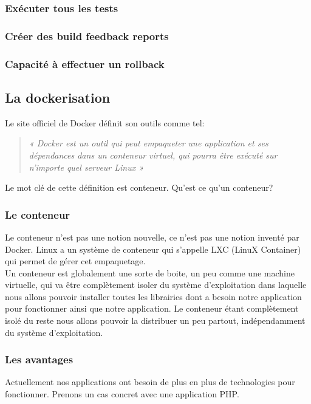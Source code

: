 \documentclass{report}
\begin{document}
        \subsubsection{Exécuter tous les tests}

        \subsubsection{Créer des build feedback reports}

        \subsubsection{Capacité à effectuer un rollback}

      \subsection{La dockerisation}
      Le site officiel de Docker définit son outils comme tel:\\

      \begin{quotation}
        \emph{« Docker est un outil qui peut empaqueter une application et ses dépendances dans un conteneur virtuel, qui pourra être exécuté sur n’importe quel serveur Linux »}\\
      \end{quotation}

      Le mot clé de cette définition est conteneur. Qu’est ce qu’un conteneur?

        \subsubsection{Le conteneur}
        Le conteneur n’est pas une notion nouvelle, ce n’est pas une notion inventé par Docker. Linux a un système de conteneur qui s’appelle LXC (LinuX Container) qui permet de gérer cet empaquetage.\\

        Un conteneur est globalement une sorte de boite, un peu comme une machine virtuelle, qui va être complètement isoler du système d’exploitation dans laquelle nous allons pouvoir installer toutes les librairies dont a besoin notre application pour fonctionner ainsi que notre application. Le conteneur étant complètement isolé du reste nous allons pouvoir la distribuer un peu partout, indépendamment du système d’exploitation.

        \subsubsection{Les avantages}
        Actuellement nos applications ont besoin de plus en plus de technologies pour fonctionner. Prenons un cas concret avec une application PHP.\\
\end{document}
